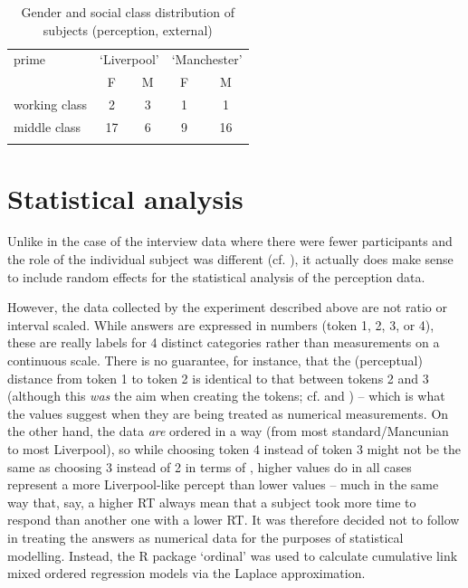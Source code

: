 \begin{table}
	\caption[Gender and {social class} of subjects (perception)]{Gender and {social class} distribution of subjects (perception, external)}
	\label{tab.participants.perception}
	
	\begin{tabular}{lcccc}
		\lsptoprule
		prime\is{priming} & \multicolumn{2}{c}{`Liverpool'} & \multicolumn{2}{c}{`Manchester'}\\
		& F & M & F & M\\
		\midrule
		working class & 2 & 3 & 1 & 1\\
		middle class & 17 & 6 & 9 & 16\\
		\lspbottomrule
	\end{tabular}
\end{table}

\section{Statistical analysis}\label{sec.perc_method.stats}

Unlike in the case of the interview data where there were fewer participants and the role of the individual subject was different (cf. ), it actually does make sense to include random effects for the statistical analysis of the perception data.

However, the data collected by the experiment described above are not ratio or interval scaled.
While answers are expressed in numbers (token 1, 2, 3, or 4), these are really labels for 4 distinct categories rather than measurements on a continuous scale.
There is no guarantee, for instance, that the (perceptual) distance from token 1 to token 2 is identical to that between tokens 2 and 3 (although this \emph{was} the aim when creating the tokens; cf.   and ) -- which is what the values suggest when they are being treated as numerical measurements.
On the other hand, the data \emph{are} ordered in a way (from most standard/Mancunian to most Liverpool), so while choosing token 4 instead of token 3 might not be the same as choosing 3 instead of 2 in terms of , higher values do in all cases represent a more Liverpool-like percept than lower values -- much in the same way that, say, a higher RT always mean that a subject took more time to respond than another one with a lower RT.
It was therefore decided not to follow \citealt{hayetal2006a,haydrager2010} in treating the answers as numerical data for the purposes of statistical modelling.
Instead, the R package `ordinal' \parencite{Rordinal} was used to calculate cumulative link mixed ordered regression models via the Laplace approximation.

